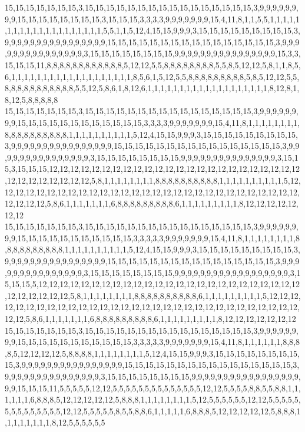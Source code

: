 15,15,15,15,15,15,15,3,15,15,15,15,15,15,15,15,15,15,15,15,15,15,15,15,3,9,9,9,9,9,9,9,9,15,15,15,15,15,15,15,15,3,15,15,15,3,3,3,3,9,9,9,9,9,9,9,15,4,11,8,1,1,5,5,1,1,1,1,1,1,1,1,1,1,1,1,1,1,1,1,1,1,1,1,5,5,1,1,5,12,4,15,15,9,9,9,3,15,15,15,15,15,15,15,15,15,3,9,9,9,9,9,9,9,9,9,9,9,9,9,9,9,9,15,15,15,15,15,15,15,15,15,15,15,15,15,15,15,15,3,9,9,9,9,9,9,9,9,9,9,9,9,9,9,9,3,15,15,15,15,15,15,15,15,9,9,9,9,9,9,9,9,9,9,9,9,9,9,9,9,15,3,3,15,15,15,11,8,8,8,8,8,8,8,8,8,8,8,8,5,12,12,5,5,8,8,8,8,8,8,8,8,5,5,8,5,12,12,5,8,1,1,8,5,6,1,1,1,1,1,1,1,1,1,1,1,1,1,1,1,1,1,1,1,8,5,6,1,5,12,5,5,8,8,8,8,8,8,8,8,8,5,8,5,12,12,5,5,8,8,8,8,8,8,8,8,8,8,8,5,5,12,5,8,6,1,8,12,6,1,1,1,1,1,1,1,1,1,1,1,1,1,1,1,1,1,1,1,8,12,8,1,8,12,5,8,8,8,8,8
15,15,15,15,15,15,15,3,15,15,15,15,15,15,15,15,15,15,15,15,15,15,15,15,3,9,9,9,9,9,9,9,9,15,15,15,15,15,15,15,15,15,15,15,15,3,3,3,3,9,9,9,9,9,9,9,15,4,11,8,1,1,1,1,1,1,1,1,8,8,8,8,8,8,8,8,8,8,1,1,1,1,1,1,1,1,1,1,5,12,4,15,15,9,9,9,3,15,15,15,15,15,15,15,15,15,3,9,9,9,9,9,9,9,9,9,9,9,9,9,9,9,9,15,15,15,15,15,15,15,15,15,15,15,15,15,15,15,15,3,9,9,9,9,9,9,9,9,9,9,9,9,9,9,9,3,15,15,15,15,15,15,15,15,9,9,9,9,9,9,9,9,9,9,9,9,9,9,9,3,15,15,3,15,15,15,12,12,12,12,12,12,12,12,12,12,12,12,12,12,12,12,12,12,12,12,12,12,12,12,12,12,12,12,12,12,12,12,5,8,1,1,1,1,1,1,1,1,8,8,8,8,8,8,8,8,8,8,1,1,1,1,1,1,1,1,1,1,5,12,12,12,12,12,12,12,12,12,12,12,12,12,12,12,12,12,12,12,12,12,12,12,12,12,12,12,12,12,12,12,12,12,5,8,6,1,1,1,1,1,1,1,6,8,8,8,8,8,8,8,8,8,6,1,1,1,1,1,1,1,1,1,8,12,12,12,12,12,12,12
15,15,15,15,15,15,15,3,15,15,15,15,15,15,15,15,15,15,15,15,15,15,15,15,3,9,9,9,9,9,9,9,9,15,15,15,15,15,15,15,15,15,15,15,3,3,3,3,3,9,9,9,9,9,9,9,15,4,11,8,1,1,1,1,1,1,1,1,8,8,8,8,8,8,8,8,8,8,1,1,1,1,1,1,1,1,1,1,5,12,4,15,15,9,9,9,3,15,15,15,15,15,15,15,15,15,3,9,9,9,9,9,9,9,9,9,9,9,9,9,9,9,9,15,15,15,15,15,15,15,15,15,15,15,15,15,15,15,15,3,9,9,9,9,9,9,9,9,9,9,9,9,9,9,9,3,15,15,15,15,15,15,15,15,9,9,9,9,9,9,9,9,9,9,9,9,9,9,9,9,9,9,3,15,15,15,5,12,12,12,12,12,12,12,12,12,12,12,12,12,12,12,12,12,12,12,12,12,12,12,12,12,12,12,12,12,12,12,5,8,1,1,1,1,1,1,1,1,8,8,8,8,8,8,8,8,8,8,6,1,1,1,1,1,1,1,1,1,5,12,12,12,12,12,12,12,12,12,12,12,12,12,12,12,12,12,12,12,12,12,12,12,12,12,12,12,12,12,12,12,12,12,5,8,6,1,1,1,1,1,1,1,6,8,8,8,8,8,8,8,8,8,6,1,1,1,1,1,1,1,1,1,8,12,12,12,12,12,12,12
15,15,15,15,15,15,15,3,15,15,15,15,15,15,15,15,15,15,15,15,15,15,15,15,3,9,9,9,9,9,9,9,9,15,15,15,15,15,15,15,15,15,15,15,3,3,3,3,3,9,9,9,9,9,9,9,15,4,11,8,1,1,1,1,1,1,8,8,8,8,5,12,12,12,12,5,8,8,8,8,1,1,1,1,1,1,1,1,5,12,4,15,15,9,9,9,3,15,15,15,15,15,15,15,15,15,3,9,9,9,9,9,9,9,9,9,9,9,9,9,9,9,9,15,15,15,15,15,15,15,15,15,15,15,15,15,15,15,15,3,9,9,9,9,9,9,9,9,9,9,9,9,9,9,9,3,15,15,15,15,15,15,15,15,9,9,9,9,9,9,9,9,9,9,9,9,9,9,9,9,9,9,9,15,15,15,11,5,5,5,5,5,12,12,5,5,5,5,5,5,5,5,5,5,5,5,5,5,12,12,5,5,5,5,8,8,5,5,8,8,1,1,1,1,1,1,6,8,8,8,5,12,12,12,12,12,5,8,8,8,1,1,1,1,1,1,1,1,5,12,5,5,5,5,5,5,12,12,5,5,5,5,5,5,5,5,5,5,5,5,5,5,12,12,5,5,5,5,5,8,5,5,8,8,6,1,1,1,1,1,6,8,8,8,5,12,12,12,12,12,5,8,8,8,1,1,1,1,1,1,1,1,8,12,5,5,5,5,5,5
